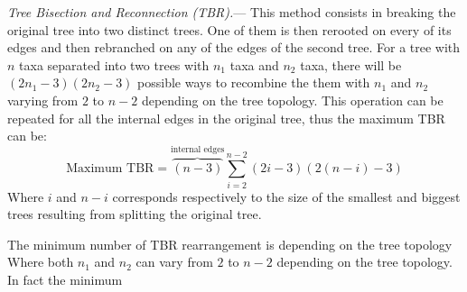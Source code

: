 \documentclass[12pt,letterpaper]{article}
\renewcommand{\subsubsection}[1]{%
\vspace{2ex}
\noindent
\textit{#1.}---}
\begin{document}
\subsubsection{Tree Bisection and Reconnection (TBR)}
This method consists in breaking the original tree into two distinct trees.
One of them is then rerooted on every of its edges and then rebranched on any of the edges of the second tree.
For a tree with $n$ taxa separated into two trees with $n_{1}$ taxa and $n_{2}$ taxa, there will be $(2n_{1}-3)(2n_{2}-3)$ possible ways to recombine the them \citep{felsenstein2004inferring} with $n_{1}$ and $n_{2}$ varying from $2$ to $n-2$ depending on the tree topology.
This operation can be repeated for all the internal edges in the original tree, thus the maximum TBR can be:
\begin{equation}
    \text{Maximum TBR} = \overbrace{(n-3)}^{\text{internal edges}} \sum_{i=2}^{n-2} (2i-3)(2(n-i)-3) %
\end{equation}
Where $i$ and $n-i$ corresponds respectively to the size of the smallest and biggest trees resulting from splitting the original tree.

The minimum number of TBR rearrangement is depending on the tree topology
Where both $n_{1}$ and $n_{2}$ can vary from $2$ to $n-2$ depending on the tree topology.
In fact the minimum
\end{document}
